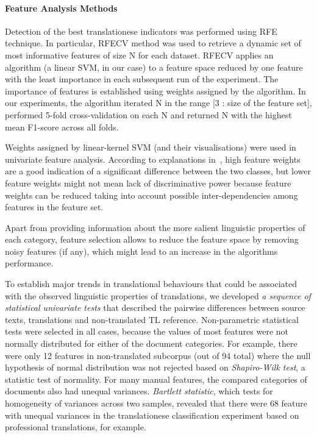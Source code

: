 \paragraph{\label{par:featanal_meths}Feature Analysis Methods}
Detection of the best translationese indicators was performed using \gls{RFE} technique. 
In particular, \gls{RFECV} method was used to retrieve a dynamic set of most informative features of size N for each dataset. 
\gls{RFECV} applies an algorithm (a linear SVM, in our case) to a feature space reduced by one feature with the least importance in each subsequent run of the experiment. The importance of features is established using weights assigned by the algorithm. In our experiments, the algorithm iterated N in the range [3 : size of the feature set], performed 5-fold cross-validation on each N and returned N with the highest mean F1-score across all folds. 

Weights assigned by linear-kernel SVM (and their visualisations) were used in univariate feature analysis. According to explanations in~\citet{Volansky2015}, high feature weights are a good indication of a significant difference between the two classes, but lower feature weights might not mean lack of discriminative power because feature weights can be reduced taking into account possible inter-dependencies among features in the feature set.  

Apart from providing information about the more salient linguistic properties of each category, feature selection allows to reduce the feature space by removing noisy features (if any), which might lead to an increase in the algorithms performance.

To establish major trends in translational behaviours that could be associated with the observed linguistic properties of translations, we developed \textit{a sequence of statistical univariate tests} that described the pairwise differences between source texts, translations and non-translated TL reference.
Non-parametric statistical tests were selected in all cases, because the values of most features were not normally distributed for either of the document categories. For example, there were only 12 features in non-translated subcorpus (out of 94 total) where the null hypothesis of normal distribution was not rejected based on \textit{Shapiro-Wilk test}, a statistic test of normality.
For many manual features, the compared categories of documents also had unequal variances.   
\textit{Bartlett statistic}, which tests for homogeneity of variances across two samples, revealed that there were 68 feature with unequal variances in the translationese classification experiment based on professional translations, for example. 

